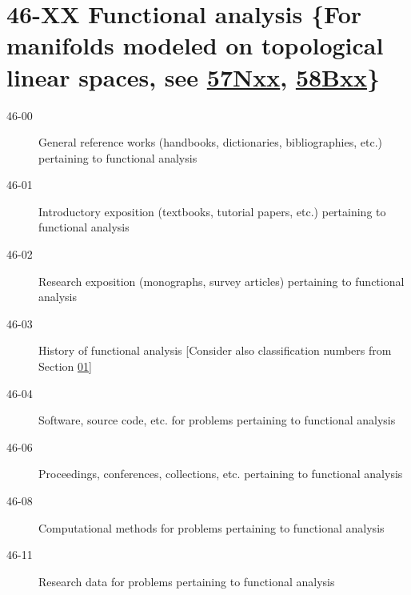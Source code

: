 \section*{46-XX Functional analysis \{For manifolds modeled on topological linear spaces, see \hyperref[57Nxx]{57Nxx}, \hyperref[58Bxx]{58Bxx}\} }\label{46-XX}
\begin{description}
\item [46-00]\label{46-00} General reference works (handbooks, dictionaries, bibliographies, etc.) pertaining to functional analysis
\item [46-01]\label{46-01} Introductory exposition (textbooks, tutorial papers, etc.) pertaining to functional analysis
\item [46-02]\label{46-02} Research exposition (monographs, survey articles) pertaining to functional analysis
\item [46-03]\label{46-03} History of functional analysis [Consider also classification numbers from Section \hyperref[01-XX]{01}]
\item [46-04]\label{46-04} Software, source code, etc. for problems pertaining to functional analysis
\item [46-06]\label{46-06} Proceedings, conferences, collections, etc. pertaining to functional analysis
\item [46-08]\label{46-08} Computational methods for problems pertaining to functional analysis
\item [46-11]\label{46-11} Research data for problems pertaining to functional analysis
\end{description}
